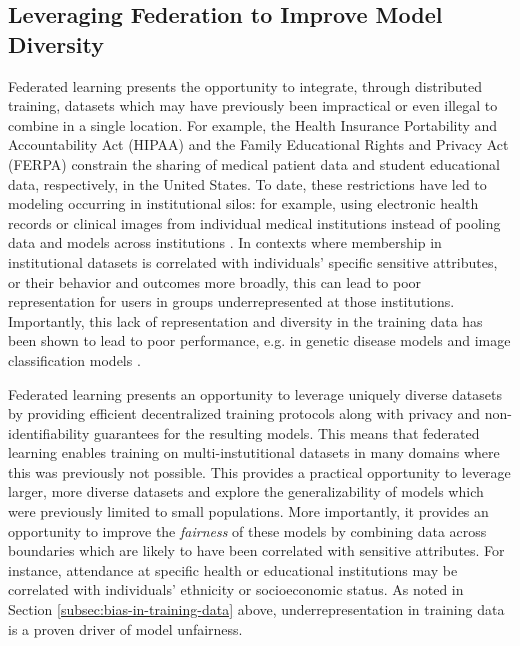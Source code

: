 \documentclass[11pt]{article}
\begin{document}
\subsection{Leveraging Federation to Improve Model Diversity}\label{subsec:diversity}

Federated learning presents the opportunity to integrate, through distributed training, datasets which may have previously been impractical or even illegal to combine in a single location. For example, the Health Insurance Portability and Accountability Act (HIPAA) and the Family Educational Rights and Privacy Act (FERPA) constrain the sharing of medical patient data and student educational data, respectively, in the United States. To date, these restrictions have led to modeling occurring in institutional silos: for example, using electronic health records or clinical images from individual medical institutions instead of pooling data and models across institutions \cite{brisimi2018federated, chang2018distributed}. In contexts where membership in institutional datasets is correlated with individuals' specific sensitive attributes, or their behavior and outcomes more broadly, this can lead to poor representation for users in groups underrepresented at those institutions. Importantly, this lack of representation and diversity in the training data has been shown to lead to poor performance, e.g. in genetic disease models \cite{martin2019current} and image classification models \cite{buolamwini2018gender}.

Federated learning presents an opportunity to leverage uniquely diverse datasets by providing efficient decentralized training protocols along with privacy and non-identifiability guarantees for the resulting models. This means that federated learning enables training on multi-instutitional datasets in many domains where this was previously not possible. This provides a practical opportunity to leverage larger, more diverse datasets and explore the generalizability of models which were previously limited to small populations. More importantly, it provides an opportunity to improve the \textit{fairness} of these models by combining data across boundaries which are likely to have been correlated with sensitive attributes. For instance, attendance at specific health or educational institutions may be correlated with individuals' ethnicity or socioeconomic status. As noted in Section \ref{subsec:bias-in-training-data} above, underrepresentation in training data is a proven driver of model unfairness. 
\end{document}
